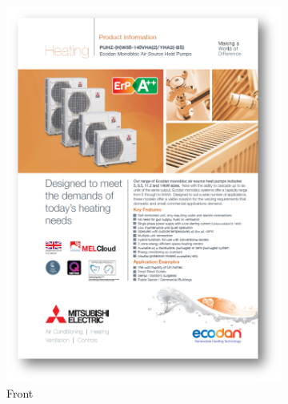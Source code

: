 \begin{figure}[htbp]
    \centering
        \begin{subfigure}{.48\textwidth}
          \centering
          \includegraphics[width=\textwidth]{figures/Mitsubishi01.png}
          \caption{Front}
          \label{mitsubishi01}
        \end{subfigure}
        \begin{subfigure}{.485\textwidth}
          \centering

\end{subfigure}
\end{figure}

